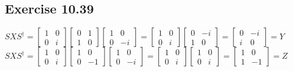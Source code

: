 \documentclass[a4paper,12pt]{article}
\begin{document}
\subsection*{Exercise 10.39}
$SXS^\dagger=
\begin{bmatrix}
    1&0\\
    0&i
\end{bmatrix}
\begin{bmatrix}
    0&1\\
    1&0
\end{bmatrix}
\begin{bmatrix}
    1&0\\
    0&-i
\end{bmatrix}=
\begin{bmatrix}
    1&0\\
    0&i
\end{bmatrix}
\begin{bmatrix}
    0&-i\\
    1&0
\end{bmatrix}=
\begin{bmatrix}
    0&-i\\
    i&0
\end{bmatrix}=Y$\\
$SXS^\dagger=
\begin{bmatrix}
    1&0\\
    0&i
\end{bmatrix}
\begin{bmatrix}
    1&0\\
    0&-1
\end{bmatrix}
\begin{bmatrix}
    1&0\\
    0&-i
\end{bmatrix}=
\begin{bmatrix}
    1&0\\
    0&i
\end{bmatrix}
\begin{bmatrix}
    1&0\\
    0&i
\end{bmatrix}=
\begin{bmatrix}
    1&0\\
    1&-1
\end{bmatrix}=Z$
\end{document}
